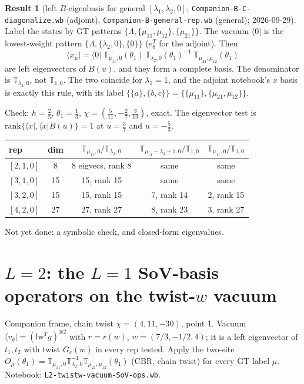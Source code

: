 \documentclass[11pt]{article}
\newcommand{\nb}[1]{\texttt{#1}}
\newcommand{\vac}{\langle 0|}
\theoremstyle{definition}
\newtheorem{result}{Result}
\theoremstyle{remark}
\begin{document}
\begin{result}[{left $B$-eigenbasis for general $[\lambda_1,\lambda_2,0]$; \nb{Companion-B-C-diagonalize.wb} (adjoint), \nb{Companion-B-general-rep.wb} (general); 2026-09-29}]
Label the states by GT patterns $\{\Lambda,\{\mu_{11},\mu_{12}\},\{\mu_{21}\}\}$. The vacuum $\vac$ is the lowest-weight pattern $\{\Lambda,\{\lambda_2,0\},\{0\}\}$ ($e_8^T$ for the adjoint). Then
\[
\langle x_\mu|=\vac\;\mathbb T_{\mu_{11},0}(\theta_1)\,\mathbb T_{\lambda_2,0}(\theta_1)^{-1}\;\mathbb T_{\mu_{21},\mu_{12}}(\theta_1)
\]
are left eigenvectors of $B(u)$, and they form a complete basis. The denominator is $\mathbb T_{\lambda_2,0}$, not $\mathbb T_{1,0}$. The two coincide for $\lambda_2=1$, and the adjoint notebook's $x$ basis is exactly this rule, with its label $\{\{a\},\{b,c\}\}=\{\{\mu_{11}\},\{\mu_{21},\mu_{12}\}\}$.

Check: $h=\tfrac25$, $\theta_1=\tfrac13$, $\chi=(\tfrac5{11},-\tfrac27,\tfrac3{13})$, exact. The eigenvector test is $\mathrm{rank}\{\langle x|,\langle x|B(u)\}=1$ at $u=\tfrac37$ and $u=-\tfrac53$.
\begin{center}
\begin{tabular}{lcccc}\toprule
rep & dim & $\mathbb T_{\mu_{11},0}/\mathbb T_{\lambda_2,0}$ & $\mathbb T_{\mu_{11}-\lambda_2+1,0}/\mathbb T_{1,0}$ & $\mathbb T_{\mu_{11},0}/\mathbb T_{1,0}$\\\midrule
$[2,1,0]$ & 8 & 8 eigvecs, rank 8 & same & same\\
$[3,1,0]$ & 15 & 15, rank 15 & same & same\\
$[3,2,0]$ & 15 & 15, rank 15 & 7, rank 14 & 2, rank 15\\
$[4,2,0]$ & 27 & 27, rank 27 & 8, rank 23 & 3, rank 27\\\bottomrule
\end{tabular}
\end{center}
Not yet done: a symbolic check, and closed-form eigenvalues.
\end{result}

\section{$L=2$: the $L=1$ SoV-basis operators on the twist-$w$ vacuum}
Companion frame, chain twist $\chi=(4,11,-30)$, point 1. Vacuum $\langle v_g|=(\mathrm{lw}^Tg)^{\otimes2}$ with $r=r(w)$, $w=(7/3,-1/2,4)$; it is a left eigenvector of $t_1,t_2$ with twist $G_c(w)$ in every rep tested. Apply the two-site $O_\mu(\theta_1)=\mathbb T_{\mu_{11},0}\mathbb T_{\lambda_2,0}^{-1}\mathbb T_{\mu_{21},\mu_{12}}(\theta_1)$ (CBR, chain twist) for every GT label $\mu$. Notebook: \nb{L2-twistw-vacuum-SoV-ops.wb}.
\end{document}
